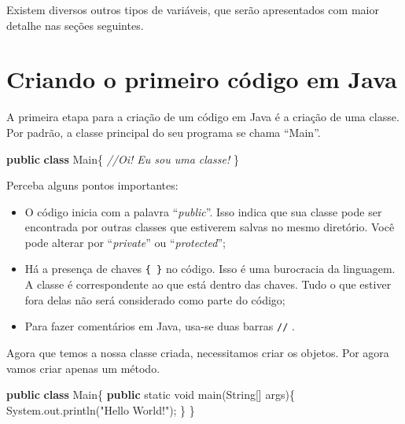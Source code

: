 \documentclass[
]{book}
\newenvironment{Shaded}{\begin{snugshade}}{\end{snugshade}}
\newcommand{\BuiltInTok}[1]{#1}
\newcommand{\CommentTok}[1]{\textcolor[rgb]{0.56,0.35,0.01}{\textit{#1}}}
\newcommand{\DataTypeTok}[1]{\textcolor[rgb]{0.13,0.29,0.53}{#1}}
\newcommand{\FunctionTok}[1]{\textcolor[rgb]{0.00,0.00,0.00}{#1}}
\newcommand{\KeywordTok}[1]{\textcolor[rgb]{0.13,0.29,0.53}{\textbf{#1}}}
\newcommand{\NormalTok}[1]{#1}
\newcommand{\StringTok}[1]{\textcolor[rgb]{0.31,0.60,0.02}{#1}}
\providecommand{\tightlist}{%
  \setlength{\itemsep}{0pt}\setlength{\parskip}{0pt}}
\begin{document}
Existem diversos outros tipos de variáveis, que serão apresentados com maior detalhe nas seções seguintes.

\hypertarget{criando-o-primeiro-cuxf3digo-em-java}{%
\section{Criando o primeiro código em Java}\label{criando-o-primeiro-cuxf3digo-em-java}}

A primeira etapa para a criação de um código em Java é a criação de uma classe. Por padrão, a classe principal do seu programa se chama ``Main''.

\begin{Shaded}
\begin{Highlighting}[]
\KeywordTok{public} \KeywordTok{class}\NormalTok{ Main\{}
  \CommentTok{//Oi! Eu sou uma classe!}
\NormalTok{\}}
\end{Highlighting}
\end{Shaded}

Perceba alguns pontos importantes:

\begin{itemize}
\tightlist
\item
  O código inicia com a palavra ``\emph{public}''. Isso indica que sua classe pode ser encontrada por outras classes que estiverem salvas no mesmo diretório. Você pode alterar por ``\emph{private}'' ou ``\emph{protected}'';
\item
  Há a presença de chaves \texttt{\{\ \}} no código. Isso é uma burocracia da linguagem. A classe é correspondente ao que está dentro das chaves. Tudo o que estiver fora delas não será considerado como parte do código;
\item
  Para fazer comentários em Java, usa-se duas barras \texttt{//} .
\end{itemize}

Agora que temos a nossa classe criada, necessitamos criar os objetos. Por agora vamos criar apenas um método.

\begin{Shaded}
\begin{Highlighting}[]
\KeywordTok{public} \KeywordTok{class}\NormalTok{ Main\{}
  \KeywordTok{public} \DataTypeTok{static} \DataTypeTok{void} \FunctionTok{main}\NormalTok{(}\BuiltInTok{String}\NormalTok{[] args)\{}
    \BuiltInTok{System}\NormalTok{.}\FunctionTok{out}\NormalTok{.}\FunctionTok{println}\NormalTok{(}\StringTok{"Hello World!"}\NormalTok{);}
\NormalTok{  \}}
\NormalTok{\}}
\end{Highlighting}
\end{Shaded}
\end{document}
